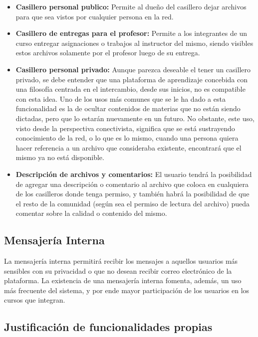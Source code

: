 \begin{itemize}

\item \textbf{Casillero personal publico:} Permite al dueño del casillero dejar archivos para que sea vistos por cualquier persona en la red.
\item \textbf{Casillero de entregas para el profesor:} Permite a los integrantes de un curso entregar asignaciones o trabajos al instructor del mismo, siendo visibles estos archivos solamente por el profesor luego de su entrega.
\item \textbf{Casillero personal privado:} Aunque parezca deseable el tener un casillero privado, se debe entender que una plataforma de aprendizaje concebida con una filosofía centrada en el intercambio, desde sus inicios, no es compatible con esta idea. Uno de los usos más comunes que se le ha dado a esta funcionalidad es la de ocultar contenidos de materias que no están siendo dictadas, pero que lo estarán nuevamente en un futuro. No obstante, este uso, visto desde la perspectiva conectivista, significa que se está sustrayendo conocimiento de la red, o lo que es lo mismo, cuando una persona quiera hacer referencia a un archivo que consideraba existente, encontrará que el mismo ya no está disponible.
\item \textbf{Descripción de archivos y comentarios:} El usuario tendrá la posibilidad de agregar una descripción o comentario al archivo que coloca en cualquiera de los casilleros donde tenga permiso, y también habrá la posibilidad de que el resto de la comunidad (según sea el permiso de lectura del archivo) pueda comentar sobre la calidad o contenido del mismo.
\end{itemize}

\subsection{Mensajería Interna}
La mensajería interna permitirá recibir los mensajes a aquellos usuarios más sensibles con su privacidad o que no desean recibir correo electrónico de la plataforma. La existencia de una mensajería interna fomenta, además, un uso más frecuente del sistema, y por ende mayor participación de los usuarios en los cursos que integran.


\subsection*{Justificación de funcionalidades propias}

